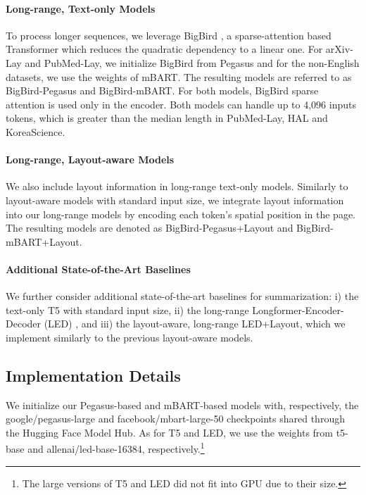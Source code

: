 \paragraph{Long-range, Text-only Models}

To process longer sequences, we leverage BigBird \citep{zaheer2020big}, a sparse-attention based Transformer which reduces the quadratic dependency to a linear one. For arXiv-Lay and PubMed-Lay, we initialize BigBird from Pegasus \citep{zaheer2020big} and for the non-English datasets, we use the weights of mBART. The resulting models are referred to as BigBird-Pegasus and BigBird-mBART. For both models, BigBird sparse attention is used only in the encoder. Both models can handle up to 4,096 inputs tokens, which is greater than the median length in PubMed-Lay, HAL and KoreaScience. 


\paragraph{Long-range, Layout-aware Models}

We also include layout information in long-range text-only models. Similarly to layout-aware models with standard input size, we integrate layout information into our long-range models by encoding each token's spatial position in the page. The resulting models are denoted as BigBird-Pegasus+Layout and BigBird-mBART+Layout.


\paragraph{Additional State-of-the-Art Baselines}

We further consider additional state-of-the-art baselines for summarization: i) the text-only T5 \citep{raffel2020exploring} with standard input size, ii) the long-range Longformer-Encoder-Decoder (LED) \citep{beltagy2020longformer}, and iii) the layout-aware, long-range LED+Layout, which we implement similarly to the previous layout-aware models.

\subsection{Implementation Details}

We initialize our Pegasus-based and mBART-based models with, respectively, the google/pegasus-large and facebook/mbart-large-50 checkpoints shared through the Hugging Face Model Hub. As for T5 and LED, we use the weights from t5-base and allenai/led-base-16384, respectively.\footnote{The large versions of T5 and LED did not fit into GPU due to their size.}

